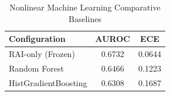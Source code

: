 \begin{table}[htbp]
\centering
\caption{Nonlinear Machine Learning Comparative Baselines}
\label{tab:ml_baselines}
\begin{tabular}{lcc}
\hline\hline
Configuration & AUROC & ECE \\
\hline
RAI-only (Frozen) & 0.6732 & 0.0644 \\
Random Forest & 0.6466 & 0.1223 \\
HistGradientBoosting & 0.6308 & 0.1687 \\
\hline
\end{tabular}
\end{table}
